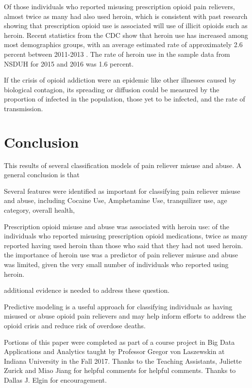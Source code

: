 \documentclass[sigconf]{acmart}
\begin{document}
Of those individuals who reported misusing prescription opioid pain relievers, 
almost twice as many had also used heroin, which is  consistent with past
research showing that prescription opioid use is associated will use of illicit 
opioids such as heroin. Recent statistics from the CDC show that heroin use has 
increased among most demographics groups, with an average estimated rate  of 
approximately 2.6 percent between 2011-2013 \cite{cdc16}. The rate of heroin use
in the sample data from NSDUH for 2015 and 2016 was 1.6 percent. 

If the crisis of opioid addiction were an epidemic like other illnesses caused 
by biological contagion, its spreading or diffusion could be measured by the 
proportion of infected in the population, those yet to be infected, and the 
rate of transmission. 

\section{Conclusion}

This results of several classification models of 
pain reliever misuse and abuse. A general conclusion is that 

Several features were identified as important for classifying pain reliever
misuse and abuse, including Cocaine Use, Amphetamine Use, tranquilizer use,
age category, overall health,

Prescription opioid misuse and abuse was associated with heroin use: of 
the individuals who reported misusing prescription opioid medications, twice 
as many reported having used heroin than those who said that they had not used 
heroin. the importance of heroin use was a predictor of pain reliever misuse and
abuse was limited, given the very small number of individuals who reported 
using heroin.

additional evidence is needed to address these question. 

Predictive modeling is a useful approach for classifying individuals as 
having misused or abuse opioid pain relievers and may help inform 
efforts to address the opioid crisis and reduce risk of overdose deaths. 


\begin{acks}

Portions of this paper were completed as part of a course project in Big Data 
Applications and Analytics taught by Professor Gregor von Laszewskin at 
Indiana University in the Fall 2017. Thanks to the Teaching Assistants, 
Juliette Zurick and Miao Jiang for helpful comments for helpful comments. 
Thanks to Dallas J. Elgin for encouragement. 

\end{acks}

 

%
\end{document}
